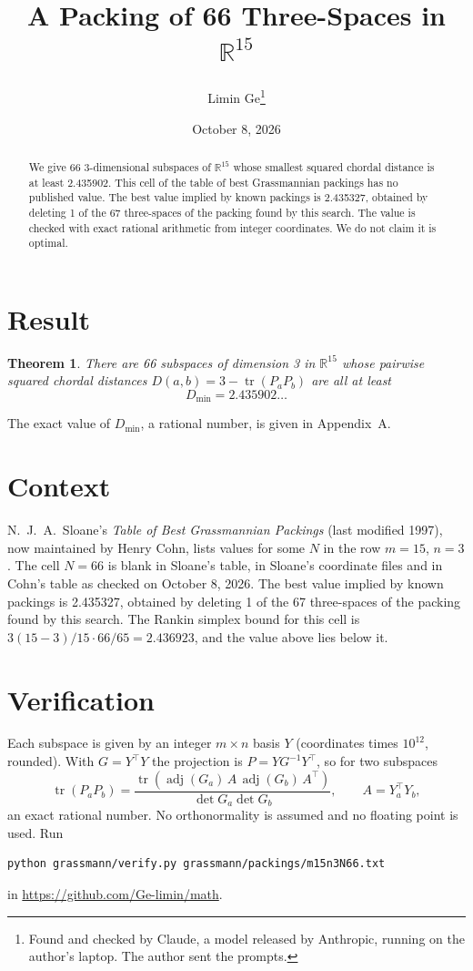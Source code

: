 \documentclass[11pt,a4paper]{article}
\title{A Packing of 66 Three-Spaces in $\mathbb{R}^{15}$}
\author{Limin Ge\thanks{Found and checked by Claude, a model released by Anthropic, running on the author's laptop. The author sent the prompts.}}
\date{October 8, 2026}
\newtheorem*{theorem}{Theorem}
\begin{document}
\maketitle
\begin{abstract}
We give 66 3-dimensional subspaces of $\mathbb{R}^{15}$ whose smallest squared chordal distance is at least 2.435902. This cell of the table of best Grassmannian packings has no published value. The best value implied by known packings is 2.435327, obtained by deleting 1 of the 67 three-spaces of the packing found by this search. The value is checked with exact rational arithmetic from integer coordinates. We do not claim it is optimal.
\end{abstract}

\section{Result}
\begin{theorem}
There are 66 subspaces of dimension 3 in $\mathbb{R}^{15}$ whose pairwise squared chordal distances $D(a,b) = 3 - \operatorname{tr}(P_aP_b)$ are all at least
\[ D_{\min} = 2.435902\ldots \]
\end{theorem}
The exact value of $D_{\min}$, a rational number, is given in Appendix~A.


\section{Context}
N.~J.~A.~Sloane's \emph{Table of Best Grassmannian Packings} (last modified 1997), now maintained by Henry Cohn, lists values for some $N$ in the row $m=15$, $n=3$. The cell $N=66$ is blank in Sloane's table, in Sloane's coordinate files and in Cohn's table as checked on October 8, 2026. The best value implied by known packings is 2.435327, obtained by deleting 1 of the 67 three-spaces of the packing found by this search. The Rankin simplex bound for this cell is $3(15-3)/15\cdot 66/65 = 2.436923$, and the value above lies below it.


\section{Verification}
Each subspace is given by an integer $m\times n$ basis $Y$ (coordinates times $10^{12}$, rounded). With $G=Y^\top Y$ the projection is $P=YG^{-1}Y^\top$, so for two subspaces
\[ \operatorname{tr}(P_aP_b)=\frac{\operatorname{tr}(\operatorname{adj}(G_a)\,A\,\operatorname{adj}(G_b)\,A^\top)}{\det G_a\det G_b},\qquad A=Y_a^\top Y_b, \]
an exact rational number. No orthonormality is assumed and no floating point is used. Run
\begin{verbatim}
python grassmann/verify.py grassmann/packings/m15n3N66.txt
\end{verbatim}
in \url{https://github.com/Ge-limin/math}.
\end{document}
